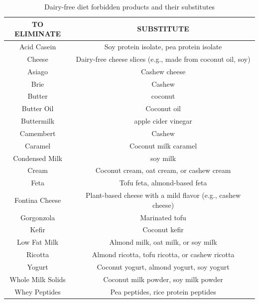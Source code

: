 \begin{table}[H]
\centering
\scriptsize
\begin{tabular}{|c|c|}
\hline
\textbf{TO ELIMINATE} & \textbf{SUBSTITUTE} \\ \hline
Acid Casein       & Soy protein isolate, pea protein isolate                    \\ \hline
Cheese            & Dairy-free cheese slices (e.g., made from coconut oil, soy) \\ \hline
Asiago            & Cashew cheese                                               \\ \hline
Brie              & Cashew                                                      \\ \hline
Butter            & coconut                                                     \\ \hline
Butter Oil        & Coconut oil                                                 \\ \hline
Buttermilk        & apple cider vinegar                                         \\ \hline
Camembert         & Cashew                                                      \\ \hline
Caramel           & Coconut milk caramel                                        \\ \hline
Condensed Milk    & soy milk                                                    \\ \hline
Cream             & Coconut cream, oat cream, or cashew cream                   \\ \hline
Feta              & Tofu feta, almond-based feta                                \\ \hline
Fontina Cheese    & Plant-based cheese with a mild flavor (e.g., cashew cheese) \\ \hline
Gorgonzola        & Marinated tofu                                              \\ \hline
Kefir             & Coconut kefir                                               \\ \hline
Low Fat Milk      & Almond milk, oat milk, or soy milk                          \\ \hline
Ricotta           & Almond ricotta, tofu ricotta, or cashew ricotta             \\ \hline
Yogurt            & Coconut yogurt, almond yogurt, soy yogurt                   \\ \hline
Whole Milk Solids & Coconut milk powder, soy milk powder                        \\ \hline
Whey Peptides     & Pea peptides, rice protein peptides                         \\ \hline
\end{tabular}
\caption{Dairy-free diet forbidden products and their substitutes}
\label{tab:dairyfree}
\end{table}


